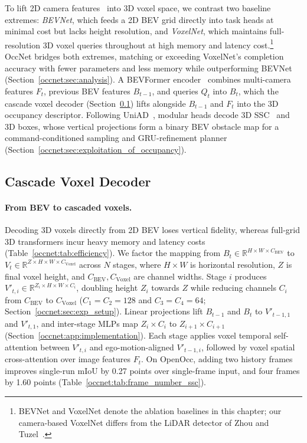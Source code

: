 To lift 2D camera features~\cite{li2022bevformer,chen2022persformer,liang2022bevfusion} into 3D voxel space, we contrast two baseline extremes: \emph{BEVNet}, which feeds a 2D BEV grid directly into task heads at minimal cost but lacks height resolution, and \emph{VoxelNet}, which maintains full-resolution 3D voxel queries throughout at high memory and latency cost.\footnote{BEVNet and VoxelNet denote the ablation baselines in this chapter; our camera-based VoxelNet differs from the LiDAR detector of Zhou and Tuzel~\cite{zhou2018voxelnet}.} OccNet bridges both extremes, matching or exceeding VoxelNet's completion accuracy with fewer parameters and less memory while outperforming BEVNet (Section~\ref{occnet:sec:analysis}). A BEVFormer encoder~\cite{li2022bevformer} combines multi-camera features $F_t$, previous BEV features $B_{t-1}$, and queries $Q_t$ into $B_t$, which the cascade voxel decoder (Section~\ref{occnet:sec:cascade_voxel_decoder}) lifts alongside $B_{t-1}$ and $F_t$ into the 3D occupancy descriptor. Following UniAD~\cite{hu2023uniad}, modular heads decode 3D SSC~\cite{song2017sscnet} and 3D boxes, whose vertical projections form a binary BEV obstacle map for a command-conditioned sampling and GRU-refinement planner (Section~\ref{occnet:sec:exploitation_of_occupancy}).

\subsection{Cascade Voxel Decoder}\label{occnet:sec:cascade_voxel_decoder}

\paragraph{From BEV to cascaded voxels.} Decoding 3D voxels directly from 2D BEV loses vertical fidelity, whereas full-grid 3D transformers incur heavy memory and latency costs (Table~\ref{occnet:tab:efficiency}). We factor the mapping from $B_t\in\mathbb{R}^{H\times W\times C_{\text{BEV}}}$ to $V_t\in\mathbb{R}^{Z\times H\times W\times C_{\text{Voxel}}}$ across $N$ stages, where $H\times W$ is horizontal resolution, $Z$ is final voxel height, and $C_{\text{BEV}}, C_{\text{Voxel}}$ are channel widths. Stage $i$ produces $V'_{t,i}\in\mathbb{R}^{Z_i\times H\times W\times C_i}$, doubling height $Z_i$ towards $Z$ while reducing channels $C_i$ from $C_{\text{BEV}}$ to $C_{\text{Voxel}}$ ($C_1=C_2=128$ and $C_3=C_4=64$; Section~\ref{occnet:sec:exp_setup}). Linear projections lift $B_{t-1}$ and $B_t$ to $V'_{t-1,1}$ and $V'_{t,1}$, and inter-stage MLPs map $Z_i\times C_i$ to $Z_{i+1}\times C_{i+1}$ (Section~\ref{occnet:app:implementation}). Each stage applies voxel temporal self-attention between $V'_{t,i}$ and ego-motion-aligned $V'_{t-1,i}$, followed by voxel spatial cross-attention over image features $F_t$. On OpenOcc, adding two history frames improves single-run mIoU by 0.27 points over single-frame input, and four frames by 1.60 points (Table~\ref{occnet:tab:frame_number_ssc}).

